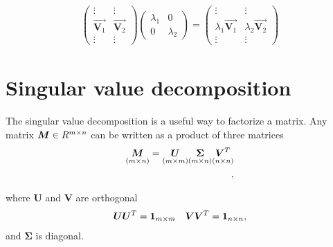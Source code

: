     \begin{equation*}
      \begin{array}{l}
        \begin{pmatrix}
            \vdots & \vdots\\
            \Vec{\mathbf{V}_{1}} & \Vec{\mathbf{V}_{2}}\\
            \vdots & \vdots
        \end{pmatrix}
        \begin{pmatrix}
            \lambda_{1} & 0\\
            0 & \lambda_{2}
        \end{pmatrix}
        =
        \begin{pmatrix}
            \vdots & \vdots\\
            \lambda_{1}\Vec{\mathbf{V}_{1}} & \lambda_{2}\Vec{\mathbf{V}_{2}}\\
            \vdots & \vdots
        \end{pmatrix}
      \end{array}
    \end{equation*}

    \section{Singular value decomposition}
    The singular value decomposition is a useful way to factorize a matrix. 
    Any matrix $\bm{M} \in R^{m \times n}$ can be written as a product of three matrices
    \begin{align}
        \underset{(m \times n)}{\bm{M}}  = \underset{(m \times m)}{\bm{U}}\underset{(m \times n)}{\bm{\Sigma}} \underset{(n \times n)}{\bm{V}^T}\\,
    \end{align}
    
    where $\bm{U}$ and $\bm{V}$ are orthogonal 
    \begin{align}
        \bm{UU}^T = \bm{1}_{m \times m} && \bm{VV}^T = \bm{1}_{n \times n},
    \end{align}
    and $\bm{\Sigma}$ is diagonal.
    
